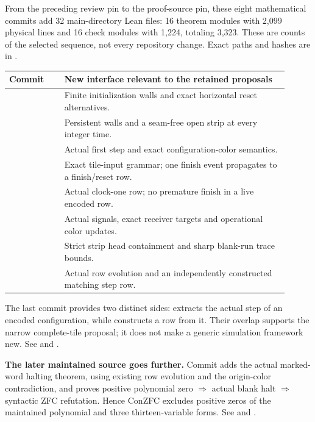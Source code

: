From the preceding review pin  to the proof-source pin, these eight mathematical commits add 32 main-directory Lean files: 16 theorem modules with 2,099 physical lines and 16 check modules with 1,224, totaling 3,323. These are counts of the selected sequence, not every repository change. Exact paths and hashes are in .

\begin{tabular}{@{}L{0.18\linewidth}L{0.73\linewidth}@{}}\toprule
Commit & New interface relevant to the retained proposals\\\midrule
{} & Finite initialization walls and exact horizontal reset alternatives.\\[3pt]
 & Persistent walls and a seam-free open strip at every integer time.\\[3pt]
 & Actual first step and exact configuration-color semantics.\\[3pt]
 & Exact tile-input grammar; one finish event propagates to a finish/reset row.\\[3pt]
 & Actual clock-one row; no premature finish in a live encoded row.\\[3pt]
 & Actual signals, exact receiver targets and operational color updates.\\[3pt]
 & Strict strip head containment and sharp blank-run trace bounds.\\[3pt]
 & Actual row evolution and an independently constructed matching step row.\\\bottomrule
\end{tabular}

The last commit provides two distinct sides:  extracts the actual step of an encoded configuration, while  constructs a row from it. Their overlap supports the narrow complete-tile proposal; it does not make a generic simulation framework new. See  and .

\textbf{The later maintained source goes further.} Commit  adds the actual marked-word halting theorem, using existing row evolution and the origin-color contradiction, and  proves positive polynomial zero $\Rightarrow$ actual blank halt $\Rightarrow$ syntactic ZFC refutation. Hence ConZFC excludes positive zeros of the maintained polynomial and three thirteen-variable forms. See  and .


